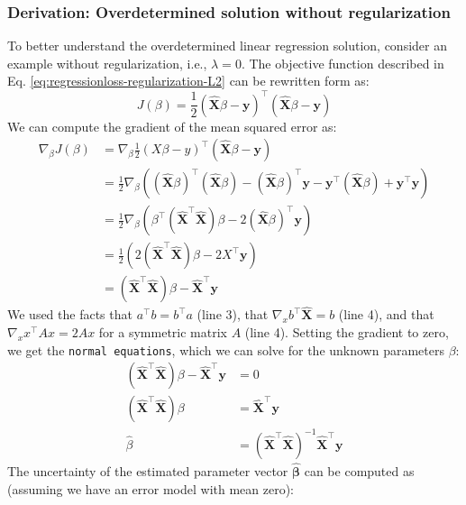 \documentclass{article}[11pt]
\begin{document}
\subsubsection*{Derivation: Overdetermined solution without regularization}
To better understand the overdetermined linear regression solution, consider an example without regularization, i.e., $\lambda=0$. The objective function described in Eq. \ref{eq:regressionloss-regularization-L2} can be rewritten form as:
\begin{equation}\label{eq:regressionloss-regularization-L2-2}
J(\beta) = \frac{1}{2}(\hat{\mathbf{X}} \beta - \mathbf{y})^\top  (\hat{\mathbf{X}} \beta - \mathbf{y})
\end{equation}
We can compute the gradient of the mean squared error as:
\begin{align*}
\nabla_\beta J(\beta) 
& = \nabla_\beta \frac{1}{2} (X \beta - y)^\top  (\hat{\mathbf{X}} \beta - \mathbf{y}) \\
& = \frac{1}{2} \nabla_\beta \left( (\hat{\mathbf{X}} \beta)^\top  (\hat{\mathbf{X}} \beta) - (\hat{\mathbf{X}} \beta)^\top \mathbf{y} - \mathbf{y}^\top (\hat{\mathbf{X}} \beta) + \mathbf{y}^\top \mathbf{y} \right) \\
& = \frac{1}{2} \nabla_\beta \left( \beta^\top  (\hat{\mathbf{X}}^\top \hat{\mathbf{X}}) \beta - 2(\hat{\mathbf{X}} \beta)^\top \mathbf{y} \right) \\
& = \frac{1}{2} \left( 2(\hat{\mathbf{X}}^\top \hat{\mathbf{X}}) \beta - 2X^\top \mathbf{y} \right) \\
& = (\hat{\mathbf{X}}^\top \hat{\mathbf{X}}) \beta - \hat{\mathbf{X}}^\top \mathbf{y}
\end{align*}
We used the facts that $a^\top b = b^\top a$ (line 3), that $\nabla_x b^\top \hat{\mathbf{X}} = b$ (line 4), and that $\nabla_x x^\top A x = 2 A x$ for a symmetric matrix $A$ (line 4).
Setting the gradient to zero, we get the \texttt{normal equations}, which we can solve for the unknown parameters $\beta$:
\begin{align*}
(\hat{\mathbf{X}}^\top \hat{\mathbf{X}}) \beta - \hat{\mathbf{X}}^\top \mathbf{y} 
& = 0 \\
(\hat{\mathbf{X}}^\top \hat{\mathbf{X}}) \beta 
& = \hat{\mathbf{X}}^\top \mathbf{y} \\
\hat{\beta} 
& = (\hat{\mathbf{X}}^\top \hat{\mathbf{X}})^{-1} \hat{\mathbf{X}}^\top \mathbf{y}
\end{align*}
The uncertainty of the estimated parameter vector $\hat{\mathbf{\beta}}$ can be computed as (assuming we have an error model with mean zero):
\end{document}
